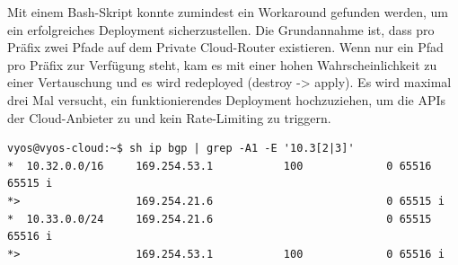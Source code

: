 Mit einem Bash-Skript konnte zumindest ein Workaround gefunden werden, um ein erfolgreiches Deployment sicherzustellen. Die Grundannahme ist, dass pro Präfix zwei Pfade auf dem Private Cloud-Router existieren. Wenn nur ein Pfad pro Präfix zur Verfügung steht, kam es mit einer hohen Wahrscheinlichkeit zu einer Vertauschung und es wird redeployed (destroy -> apply). Es wird maximal drei Mal versucht, ein funktionierendes Deployment hochzuziehen, um die APIs der Cloud-Anbieter zu  und kein Rate-Limiting zu triggern.

\begin{lstlisting}[label=tf-base-deployment-bgp-ok,caption=BGP Status]
vyos@vyos-cloud:~$ sh ip bgp | grep -A1 -E '10.3[2|3]'
*  10.32.0.0/16     169.254.53.1           100             0 65516 65515 i
*>                  169.254.21.6                           0 65515 i
*  10.33.0.0/24     169.254.21.6                           0 65515 65516 i
*>                  169.254.53.1           100             0 65516 i
\end{lstlisting}


